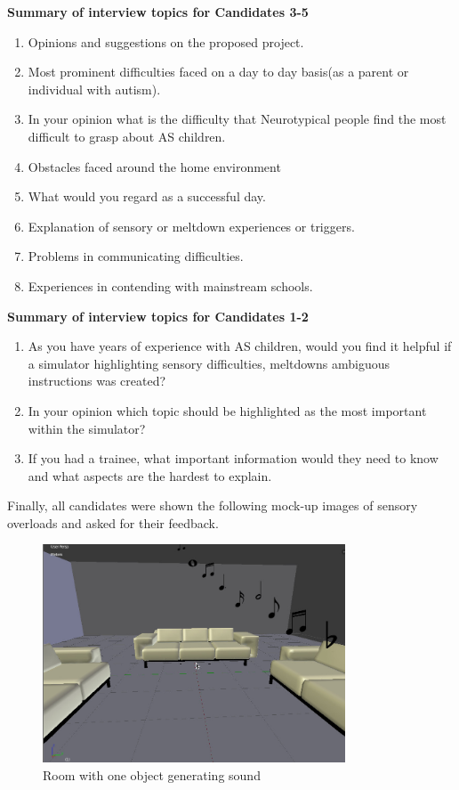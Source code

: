 \documentclass[11pt]{report}
\begin{document}
\textbf{Summary of interview topics for Candidates 3-5}
\begin{enumerate}
\item Opinions and suggestions on the proposed project.
\item Most prominent difficulties faced on a day to day basis(as a parent or individual with autism).
\item In your opinion what is the difficulty that Neurotypical people find the most difficult to grasp about AS children.
\item Obstacles faced around the home environment
\item What would you regard as a successful day.
\item Explanation of sensory or meltdown experiences or triggers.
\item Problems in communicating difficulties.
\item Experiences in contending with mainstream schools.
\end{enumerate}

\textbf{Summary of interview topics for Candidates 1-2}
\begin{enumerate}
\item As you have years of experience with AS children, would you find it helpful if a simulator highlighting sensory difficulties, meltdowns ambiguous instructions was created?
\item In your opinion which topic should be highlighted as the most important within the simulator? 
\item If you had a trainee, what important information would they need to know and what aspects are the hardest to explain.
\end{enumerate}

Finally, all candidates were shown the following mock-up images of sensory overloads and asked for their feedback. 

\begin{figure}[H]
\centering
\includegraphics[width=90mm]{images/design/GD_basic.jpg}
\caption{Room with one object generating sound}
\label{sensorymockup1}
\end{figure}
\end{document}
